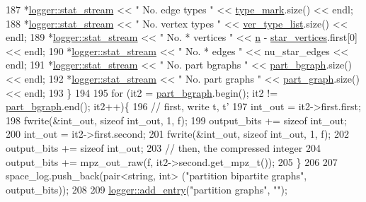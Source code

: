 \begin{DoxyCode}
187     *\hyperlink{classlogger_a7db37821f875f2ba3540980b355779f5}{logger::stat\_stream} << \textcolor{stringliteral}{" No. edge types    "} << 
      \hyperlink{classmarked__graph__compressed_a86b00223525703e973415cbc9c94da68}{type\_mark}.size() << endl;
188     *\hyperlink{classlogger_a7db37821f875f2ba3540980b355779f5}{logger::stat\_stream} << \textcolor{stringliteral}{" No. vertex types  "} << 
      \hyperlink{classmarked__graph__compressed_af2e3e55223d436628a02758dfae88493}{ver\_type\_list}.size() << endl;
189     *\hyperlink{classlogger_a7db37821f875f2ba3540980b355779f5}{logger::stat\_stream} << \textcolor{stringliteral}{" No. * vertices    "} << \hyperlink{classmarked__graph__compressed_a8d841016ddb11cfd33748c8deb6277ba}{n} - 
      \hyperlink{classmarked__graph__compressed_a7a4ced4586e2e353f9076bd447df5208}{star\_vertices}.first[0] << endl;
190     *\hyperlink{classlogger_a7db37821f875f2ba3540980b355779f5}{logger::stat\_stream} << \textcolor{stringliteral}{" No. * edges       "} << nu\_star\_edges << endl;
191     *\hyperlink{classlogger_a7db37821f875f2ba3540980b355779f5}{logger::stat\_stream} << \textcolor{stringliteral}{" No. part bgraphs  "} << 
      \hyperlink{classmarked__graph__compressed_a7b3267063fba30b45eb21b3ba4e07536}{part\_bgraph}.size() << endl;
192     *\hyperlink{classlogger_a7db37821f875f2ba3540980b355779f5}{logger::stat\_stream} << \textcolor{stringliteral}{" No. part graphs   "} << 
      \hyperlink{classmarked__graph__compressed_ae179a4737e6eab905c18a94d44ef64b7}{part\_graph}.size() << endl;
193   \}
194 
195   \textcolor{keywordflow}{for} (it2 = \hyperlink{classmarked__graph__compressed_a7b3267063fba30b45eb21b3ba4e07536}{part\_bgraph}.begin(); it2 != \hyperlink{classmarked__graph__compressed_a7b3267063fba30b45eb21b3ba4e07536}{part\_bgraph}.end(); it2++)\{
196     \textcolor{comment}{// first, write t, t'}
197     int\_out = it2->first.first;
198     fwrite(&int\_out, \textcolor{keyword}{sizeof} int\_out, 1, f);
199     output\_bits += \textcolor{keyword}{sizeof} int\_out;
200     int\_out = it2->first.second;
201     fwrite(&int\_out, \textcolor{keyword}{sizeof} int\_out, 1, f);
202     output\_bits += \textcolor{keyword}{sizeof} int\_out;
203     \textcolor{comment}{// then, the compressed integer}
204     output\_bits += mpz\_out\_raw(f, it2->second.get\_mpz\_t());
205   \}
206 
207   space\_log.push\_back(pair<string, int> (\textcolor{stringliteral}{"partition bipartite graphs"}, output\_bits));
208 
209   \hyperlink{classlogger_a710163deb17bc81f70d53d285b8ac9ac}{logger::add\_entry}(\textcolor{stringliteral}{"partition graphs"}, \textcolor{stringliteral}{""});

\end{DoxyCode}
